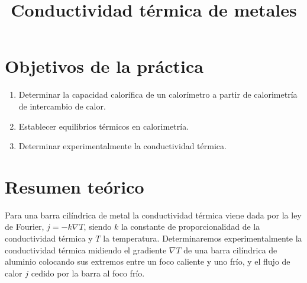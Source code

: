 \documentclass[a4paper,12pt,spanish]{article}
\begin{document}
	
	
	\title{Conductividad térmica de metales}
	
	\date{}
	
	\maketitle
	
	
	\iffalse %
	\begin{abstract} %
		
		
		Pretendemos estudiar la conservación de la energía mecánica de un sólido con rotación y desplazamiento, y la determinación del momento de inercia de la rueda de Maxwell.
		
		
		
	\end{abstract} 
	\fi
	
\iffalse
I don't want this to happen
\fi



	
	\section{Objetivos de la práctica}
	
	
	\begin{enumerate}
		\item Determinar la capacidad calorífica de un calorímetro a partir de calorimetría de intercambio de calor.
		\item Establecer equilibrios térmicos en calorimetría.
		\item Determinar experimentalmente la conductividad térmica.
	\end{enumerate}
	
	
	
	\section{Resumen teórico}
	
	Para una barra cilíndrica de metal la conductividad térmica viene dada por la ley de Fourier, $j = -k\nabla T $, siendo $k$ la constante de proporcionalidad de la conductividad térmica y $T$ la temperatura.
	Determinaremos experimentalmente la conductividad térmica midiendo el gradiente $\nabla T$ de una barra cilíndrica de aluminio colocando sus extremos entre un foco caliente y uno frío, y el flujo de calor $j$ cedido por la barra al foco frío.
	
\end{document}
